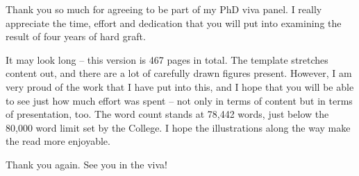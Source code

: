 
\begin{preamble}
{}

Thank you so much for agreeing to be part of my PhD viva panel. I really appreciate the time, effort and dedication that you will put into examining the result of four years of hard graft.

It may look long -- this version is 467 pages in total. The template stretches content out, and there are a lot of carefully drawn figures present. However, I am very proud of the work that I have put into this, and I hope that you will be able to see just how much effort was spent -- not only in terms of content but in terms of presentation, too. The word count stands at 78,442 words, just below the 80,000 word limit set by the College. I hope the illustrations along the way make the read more enjoyable.

Thank you again. See you in the viva!
\end{preamble}
